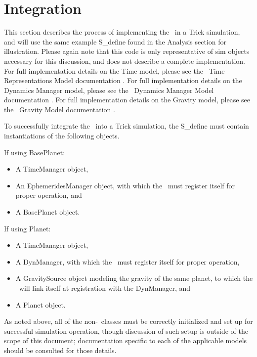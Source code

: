 \section{Integration}

This section describes the process of implementing the \planetDesc\ in a Trick
simulation, and will use the same example S\_define found in the Analysis
section for illustration. Please again note that this code is only
representative of sim objects necessary for this discussion, and does not
describe a complete implementation. For full implementation details on the Time
model, please see the \JEODid\ Time Representations Model documentation
\cite{dynenv:TIME}. For full implementation details on the Dynamics Manager
model, please see the \JEODid\ Dynamics Manager Model documentation
\cite{dynenv:DYNMANAGER}. For full implementation details on the Gravity model,
please see the \JEODid\ Gravity Model documentation \cite{dynenv:GRAVITY}.

To successfully integrate the \planetDesc\ into a Trick simulation, the
S\_define must contain instantiations of the following objects.

If using BasePlanet:
\begin{itemize}
\item A TimeManager object,
\item An EphemeridesManager object, with which the \planetDesc\ must register
itself for proper operation, and
\item A BasePlanet object.
\end{itemize}

If using Planet:
\begin{itemize}
\item A TimeManager object,
\item A DynManager, with which the \planetDesc\ must register itself
for proper operation,
\item A GravitySource object modeling the gravity of the same planet, to which
the \planetDesc\ will link itself at registration with the DynManager, and
\item A Planet object.
\end{itemize}

As noted above, all of the non-\planetDesc\ classes must be correctly
initialized and set up for successful simulation operation, though discussion
of such setup is outside of the scope of this document; documentation specific
to each of the applicable models should be consulted for those details.

